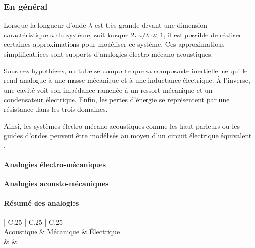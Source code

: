 \subsubsection{En général}

Lorsque la longueur d'onde $\lambda$ est très grande devant une dimension caractéristique $a$ du système, soit lorsque $2\pi a/\lambda \ll 1$, il est possible de réaliser certaines approximations pour modéliser ce système. Ces approximations simplificatrices sont supports d'analogies électro-mécano-acoustiques. 

Sous ces hypothèses, un tube se comporte que sa composante inertielle, ce qui le rend analogue à une masse mécanique et à une inductance électrique. À l'inverse, une cavité voit son impédance ramenée à un ressort mécanique et un condensateur électrique. Enfin, les pertes d'énergie se représentent par une résistance dans les trois domaines.

Ainsi, les systèmes électro-mécano-acoustiques comme les haut-parleurs ou les guides d'ondes peuvent être modélisés au moyen d'un circuit électrique équivalent \cite{Electroac_Grains}. 
%
%    

\paragraph{Analogies électro-mécaniques}


\paragraph{Analogies acousto-mécaniques}

\paragraph{Résumé des analogies}

\begin{table}[!ht]
	\caption{Analogies électro-mécano-acoustiques}
	\label{tab:AnalogElectroMecanoAcoust}
	\centering
	\begin{tabular}{| C{.25\textwidth} | C{.25\textwidth} | C{.25\textwidth} |}
	\hline
	 \\\hline
	Acoustique & Mécanique & \'Electrique \\
	 &  &  \\
	\hline
	
	\end{tabular}
\end{table}

